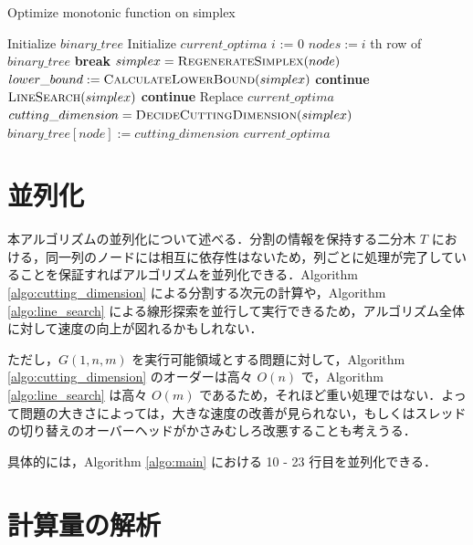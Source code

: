 \documentclass[a4paper,11pt]{jreport}
\newcommand{\Continue}{\State \textbf{continue} }
\newcommand{\Break}{\State \textbf{break} }
\begin{document}
\begin{algorithm}
\caption{Optimize monotonic function on simplex}
\label{algo:main}
\begin{algorithmic}[1]
\State Initialize $ binary\_tree $
\State Initialize $ current\_optima $
\State $ i $ := 0
\State $ nodes := i $ th row of $ binary\_tree $
\Break
\EndIf
{}
\State $ simplex = \Call{RegenerateSimplex}{node} $
\State $ lower\_bound := \Call{CalculateLowerBound}{simplex} $
\Continue
\EndIf
{}
\State $ \Call{LineSearch}{simplex} $
\Continue
\EndIf
{}
\State Replace $ current\_optima $
\EndIf
\State $ cutting\_dimension = \Call{DecideCuttingDimension}{simplex} $
\State $ binary\_tree[node] := cutting\_dimension $
\EndFor
\EndWhile
\State \Return $ current\_optima $
\end{algorithmic}
\end{algorithm}

\section{並列化} \label{sec:parallel}

本アルゴリズムの並列化について述べる．分割の情報を保持する二分木 $ T $ における，同一列のノードには相互に依存性はないため，列ごとに処理が完了していることを保証すればアルゴリズムを並列化できる．Algorithm \ref{algo:cutting_dimension} による分割する次元の計算や，Algorithm \ref{algo:line_search} による線形探索を並行して実行できるため，アルゴリズム全体に対して速度の向上が図れるかもしれない．\par
ただし，$ G(1, n, m) $ を実行可能領域とする問題に対して，Algorithm \ref{algo:cutting_dimension} のオーダーは高々 $ O(n) $ で，Algorithm \ref{algo:line_search} は高々 $ O(m) $ であるため，それほど重い処理ではない．よって問題の大きさによっては，大きな速度の改善が見られない，もしくはスレッドの切り替えのオーバーヘッドがかさみむしろ改悪することも考えうる．\par
具体的には，Algorithm \ref{algo:main} における 10 - 23 行目を並列化できる．

\section{計算量の解析} \label{sec:analysis}
\end{document}
